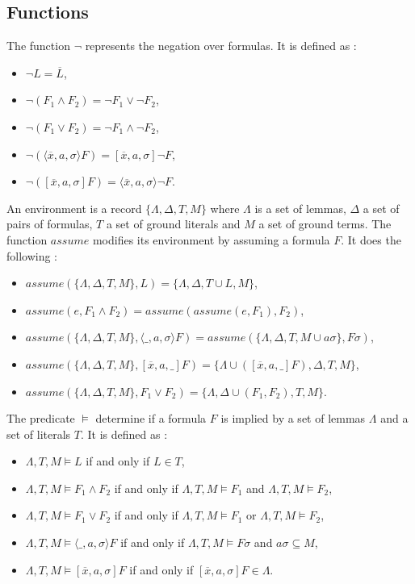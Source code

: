 \documentclass[a4paper,10pt]{report}
\newcommand{\A}{\mathit{assume}}
\begin{document}
\subsection{Functions}
\noindent
The function $\neg$ represents the negation over formulas. It is defined as :
\begin{itemize}
 \item $\neg L=\overline L$,
 \item $\neg(F_1\wedge F_2)=\neg F_1\vee\neg F_2$,
 \item $\neg(F_1\vee F_2)=\neg F_1\wedge\neg F_2$,
 \item $\neg(\langle\overline x,a,\sigma\rangle F)=[\overline x,a,\sigma]\neg F$,
 \item $\neg([\overline x,a,\sigma]F)=\langle\overline x,a,\sigma\rangle\neg F$.
\end{itemize}
An environment is a record $\{\Lambda,\Delta,T,M\}$ where $\Lambda$ is a set of lemmas,
$\Delta$ a set of pairs of formulas, $T$ a set of ground literals and
$M$ a set of ground terms. The function $\A$ modifies its environment by assuming a formula
$F$. It does the following :
\begin{itemize}
 \item $\A(\{\Lambda,\Delta,T,M\},L)=\{\Lambda,\Delta,T\cup L,M\}$,
 \item $\A(e,F_1\wedge F_2)=\A(\A(e,F_1),F_2)$,
 \item $\A(\{\Lambda,\Delta,T,M\},\langle\_,a,\sigma\rangle F)=
\A(\{\Lambda,\Delta,T,M\cup a\sigma\},F\sigma)$,
 \item $\A(\{\Lambda,\Delta,T,M\},[\overline x,a,\_]F)=\{\Lambda\cup([\overline x,a,\_]F),\Delta,T,M\}$,
 \item $\A(\{\Lambda,\Delta,T,M\},F_1\vee F_2)=\{\Lambda,\Delta\cup(F_1,F_2),T,M\}$.
\end{itemize}
The predicate $\vDash$ determine if a formula $F$ is implied by a set of lemmas $\Lambda$ and
a set of literals $T$. It is defined as :
\begin{itemize}
 \item $\Lambda,T,M\vDash L$ if and only if $L\in T$,
 \item $\Lambda,T,M\vDash F_1\wedge F_2$ if and only if $\Lambda,T,M\vDash F_1$
and $\Lambda,T,M\vDash F_2$,
 \item $\Lambda,T,M\vDash F_1\vee F_2$ if and only if $\Lambda,T,M\vDash F_1$ or
$\Lambda,T,M\vDash F_2$,
 \item $\Lambda,T,M\vDash\langle\_,a,\sigma\rangle F$ if and only if $\Lambda,T,M\vDash F\sigma$
and $a\sigma\subseteq M$,
 \item $\Lambda,T,M\vDash[\overline x,a,\sigma]F$ if and only if $[\overline x,a,\sigma]F\in\Lambda$.
\end{itemize}
\end{document}
